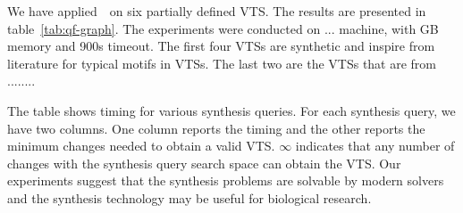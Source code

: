 We have applied~\ourtool~on six partially defined VTS.
%
The results are presented in table~\ref{tab:qf-graph}.
%
The experiments were conducted on ... machine,
with GB memory and 900s timeout.
%
The first four VTSs are synthetic and inspire from literature for typical
motifs in VTSs. 
%
The last two are the VTSs that are from ........

The table shows timing for various synthesis queries.
%
For each synthesis query, we have two columns.
%
One column reports the timing and the other reports the minimum changes
needed to obtain a valid VTS.
%
$\infty$ indicates that any number of changes with the synthesis query
search space can obtain the VTS.
%
%
%
Our experiments suggest that the synthesis problems are solvable by modern
solvers and the synthesis technology may be useful for biological research.
%


